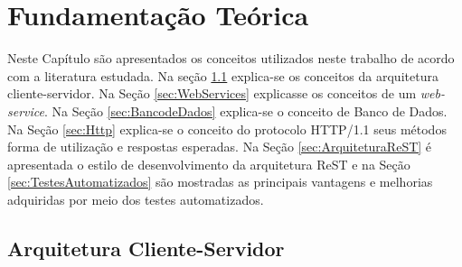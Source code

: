 
\chapter{Fundamentação Teórica}\label{cap:funTeorica}

Neste Capítulo são apresentados os conceitos utilizados neste trabalho de acordo com a literatura estudada. Na seção \ref{sec:ArquiteturaClienteServidor} explica-se os conceitos da arquitetura cliente-servidor. Na Seção \ref{sec:WebServices} explicasse os conceitos de um \textit{web-service}. Na Seção \ref{sec:BancodeDados} explica-se o conceito de Banco de Dados. Na Seção \ref{sec:Http} explica-se o conceito do protocolo HTTP/1.1 seus métodos forma de utilização e respostas esperadas. Na Seção \ref{sec:ArquiteturaReST} é apresentada o estilo de desenvolvimento da arquitetura ReST e na Seção \ref{sec:TestesAutomatizados} são mostradas as principais vantagens e melhorias adquiridas por meio dos testes automatizados.


\section{Arquitetura Cliente-Servidor}\label{sec:ArquiteturaClienteServidor}

